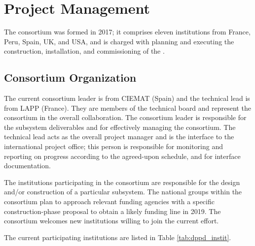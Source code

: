 \section{Project Management}
\label{sec:dp-pds-management}

The    consortium was formed in 2017;  it comprises eleven institutions from France, Peru, Spain, UK, and USA, and is charged %
with planning and executing the construction, installation, and commissioning of the   .

\subsection{Consortium Organization}

The current   consortium leader is %
 from CIEMAT (Spain) and the technical lead is %
 from LAPP (France). They are members of the  technical board and represent the consortium in the overall  collaboration. The consortium leader is responsible for the subsystem deliverables and for effectively managing the consortium. The technical lead acts as the overall project manager and is the interface to the international project office; this person is responsible for monitoring and reporting on progress according to the agreed-upon schedule, and for interface documentation.

The institutions participating in the consortium are responsible for the design and/or construction of a particular subsystem. The national groups within the consortium plan to approach relevant funding agencies with a specific construction-phase proposal to obtain a likely funding line in 2019. The   consortium %
welcomes new institutions willing to join the current effort.

The current participating institutions %
are listed in Table \ref{tab:dppd_instit}.

